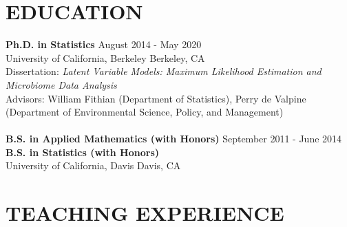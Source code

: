 \documentclass{res}
\begin{document}
\newcommand*\leftright[2]{%
\leavevmode
  {#1}%
  \hfill%
  #2}
\newcommand*\leftrighta[2]{%
  \leavevmode
  \rlap{#1}%
  \hspace{0.5\linewidth}%
  #2}


\address{Phone: (510) 676-8616 | Email: jcyhong@berkeley.edu | Website: http://jcyhong.github.io}
                                  
\begin{resume}  
 
\section{EDUCATION}
    \leftright{\textbf{Ph.D. in Statistics}}{August 2014 - May 2020} \\ 
    \leftright{University of California, Berkeley}{Berkeley, CA}\\
    Dissertation: \textit{Latent Variable Models: Maximum Likelihood Estimation and Microbiome Data Analysis}\\
    Advisors: William Fithian (Department of Statistics), Perry de Valpine (Department of Environmental Science, Policy, and Management)
    \\
    \\
    \leftright{\textbf{B.S. in Applied Mathematics (with Honors)}}{September 2011 - June 2014} \\
    \textbf{B.S. in Statistics (with Honors)} \\
    \leftright{University of California, Davis}{Davis, CA} \\

\section{TEACHING EXPERIENCE}


\end{resume}
\end{document}
